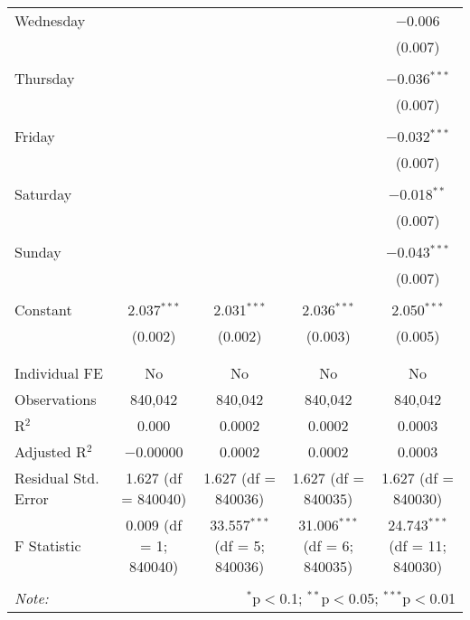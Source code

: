 \documentclass[
]{article}
\begin{document}
\begin{table}[!htbp]
{\begin{tabular}{@{\extracolsep{5pt}}lcccc}
 Wednesday &  &  &  & $-$0.006 \\ 
  &  &  &  & (0.007) \\ 
  & & & & \\ 
 Thursday &  &  &  & $-$0.036$^{***}$ \\ 
  &  &  &  & (0.007) \\ 
  & & & & \\ 
 Friday &  &  &  & $-$0.032$^{***}$ \\ 
  &  &  &  & (0.007) \\ 
  & & & & \\ 
 Saturday &  &  &  & $-$0.018$^{**}$ \\ 
  &  &  &  & (0.007) \\ 
  & & & & \\ 
 Sunday &  &  &  & $-$0.043$^{***}$ \\ 
  &  &  &  & (0.007) \\ 
  & & & & \\ 
 Constant & 2.037$^{***}$ & 2.031$^{***}$ & 2.036$^{***}$ & 2.050$^{***}$ \\ 
  & (0.002) & (0.002) & (0.003) & (0.005) \\ 
  & & & & \\ 
\hline \\[-1.8ex] 
Individual FE & No & No & No & No \\ 
Observations & 840,042 & 840,042 & 840,042 & 840,042 \\ 
R$^{2}$ & 0.000 & 0.0002 & 0.0002 & 0.0003 \\ 
Adjusted R$^{2}$ & $-$0.00000 & 0.0002 & 0.0002 & 0.0003 \\ 
Residual Std. Error & 1.627 (df = 840040) & 1.627 (df = 840036) & 1.627 (df = 840035) & 1.627 (df = 840030) \\ 
F Statistic & 0.009 (df = 1; 840040) & 33.557$^{***}$ (df = 5; 840036) & 31.006$^{***}$ (df = 6; 840035) & 24.743$^{***}$ (df = 11; 840030) \\ 
\hline 
\hline \\[-1.8ex] 
\textit{Note:}  & \multicolumn{4}{r}{$^{*}$p$<$0.1; $^{**}$p$<$0.05; $^{***}$p$<$0.01} \\ 
\end{tabular}
} 
\end{table} 
\newpage
\end{document}
